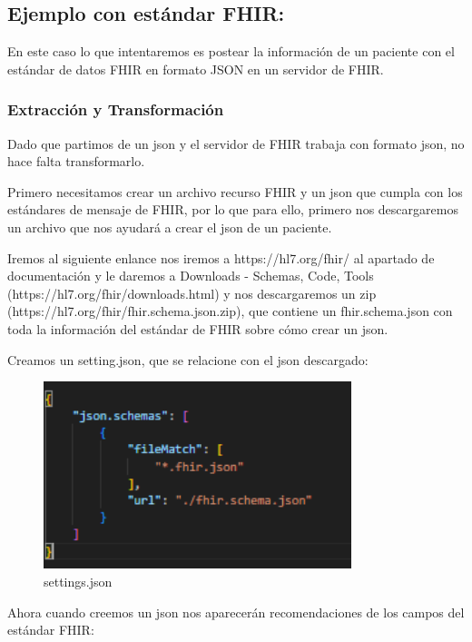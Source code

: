 \documentclass[12pt, a4paper, twoside]{article}
\begin{document}
	
	\subsection{Ejemplo con estándar  FHIR:}
	En este caso lo que intentaremos es postear la información de un paciente con el estándar de datos FHIR en formato JSON en un servidor de  FHIR.
	
	\subsubsection{Extracción y Transformación}
	Dado que partimos de un json y el servidor de FHIR trabaja con formato json, no hace falta transformarlo.
	
	Primero necesitamos crear un archivo recurso FHIR y un json que cumpla con los estándares de mensaje de FHIR, por lo que para ello, primero nos descargaremos un archivo que nos ayudará a crear el json de un paciente. 
	
	Iremos al siguiente enlance nos iremos a https://hl7.org/fhir/ al apartado de documentación y le daremos a Downloads - Schemas, Code, Tools (https://hl7.org/fhir/downloads.html) y nos descargaremos un zip (https://hl7.org/fhir/fhir.schema.json.zip), que contiene un fhir.schema.json con toda la información del estándar de FHIR sobre cómo crear un json.
	
	Creamos un setting.json, que se relacione con el json descargado: 
	
	\begin{figure}[h!]
		\centering
		\includegraphics[width=0.8\textwidth]{image/3.png}
		\caption{settings.json}
		\label{fig:3}
	\end{figure}
	
	Ahora cuando creemos un json nos aparecerán recomendaciones de los campos del estándar FHIR:
	
\end{document}
